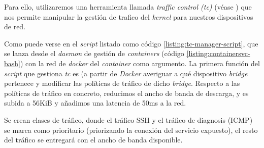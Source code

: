 Para ello, utilizaremos una herramienta llamada \emph{traffic control (tc)} (véase \cite{man-tc}) que nos permite manipular la gestión de trafico del \emph{kernel}
para nuestros dispositivos de red.

Como puede verse en el \emph{script} listado como código \ref{listing:tc-manager-script}, que se lanza desde el \emph{daemon} de gestión de \emph{containers} (código \ref{listing:containersvc-bash})
con la red de \emph{docker} del \emph{container} como argumento. La primera función del \emph{script} que gestiona \emph{tc} es (a partir de \emph{Docker}
averiguar a qué dispositivo \emph{bridge} pertenece y modificar las políticas de tráfico de dicho \emph{bridge}.
Respecto a las políticas de tráfico en concreto, reducimos el ancho de banda de descarga, y es subida a 56KiB y añadimos una latencia
de 50ms a la red. 

Se crean clases de tráfico, donde el tráfico SSH y el tráfico de diagnosis (ICMP) se marca como prioritario (priorizando la conexión del servicio expuesto),
el resto del tráfico se entregará con el ancho de banda disponible.


